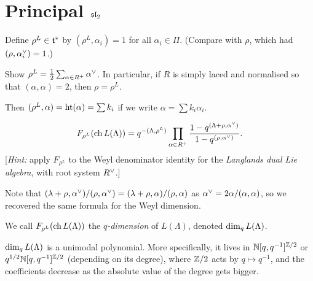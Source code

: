 \section{Principal \texorpdfstring{$\sl_2$}{sl(2)}}

Define $\rho^L \in \at^*$ by $(\rho^L, \alpha_i) = 1$ for all
$\alpha_i \in \Pi$. (Compare with $\rho$, which had $(\rho, \alpha_i\cv) = 1$.)

\begin{exercise}
Show $\rho^L = \frac12\sum_{\alpha \in R^+} \alpha\cv$. In particular, if $R$
is simply laced and normalised so that $(\alpha, \alpha) = 2$, then
$\rho = \rho^L$.
\end{exercise}

Then $(\rho^L, \alpha) = \htt(\alpha) = \sum k_i$ if we write
$\alpha = \sum k_i\alpha_i$.

\begin{exercise}
\[
  F_{\rho^L}(\ch L(\Lambda)) = q^{-(\Lambda, \rho^L)}\prod_{\alpha \in R^+}
    \frac{1 - q^{(\Lambda+\rho, \alpha\cv)}}{1 - q^{(\rho, \alpha\cv)}}.
\]
[\emph{Hint:} apply $F_{\rho^L}$ to the Weyl denominator identity for the
\emph{Langlands dual Lie algebra}, with root system $R\cv$.]
\end{exercise}

Note that $(\lambda + \rho, \alpha\cv)/(\rho, \alpha\cv) = (\lambda + \rho, \alpha)/(\rho, \alpha)$
as $\alpha\cv = 2\alpha/(\alpha, \alpha)$, so we recovered the same formula
for the Weyl dimension.

\begin{definition}
We call $F_{\rho^L}(\ch L(\Lambda))$ the \emph{$q$-dimension} of $L(\Lambda)$,
denoted $\dimq L(\Lambda)$.
\end{definition}

\begin{proposition}
$\dimq L(\Lambda)$ is a unimodal polynomial. More specifically, it lives in
$\N[q, q^{-1}]^{\Z/2}$ or $q^{1/2}\N[q, q^{-1}]^{\Z/2}$ (depending on its
degree), where $\Z/2$ acts by $q \mapsto q^{-1}$, and the coefficients
decrease as the absolute value of the degree gets bigger.
\end{proposition}

